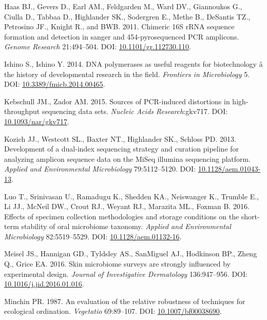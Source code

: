 \documentclass[12pt,]{article}
\begin{document}
\hypertarget{ref-Haas2011}{}
Haas BJ., Gevers D., Earl AM., Feldgarden M., Ward DV., Giannoukos G.,
Ciulla D., Tabbaa D., Highlander SK., Sodergren E., Methe B., DeSantis
TZ., Petrosino JF., Knight R., and BWB. 2011. Chimeric 16S rRNA sequence
formation and detection in sanger and 454-pyrosequenced PCR amplicons.
\emph{Genome Research} 21:494--504. DOI:
\href{https://doi.org/10.1101/gr.112730.110}{10.1101/gr.112730.110}.

\hypertarget{ref-polymerase_Ishino_2014}{}
Ishino S., Ishino Y. 2014. DNA polymerases as useful reagents for
biotechnology â the history of developmental research in the field.
\emph{Frontiers in Microbiology} 5. DOI:
\href{https://doi.org/10.3389/fmicb.2014.00465}{10.3389/fmicb.2014.00465}.

\hypertarget{ref-Kebschull2015}{}
Kebschull JM., Zador AM. 2015. Sources of PCR-induced distortions in
high-throughput sequencing data sets. \emph{Nucleic Acids
Research}:gkv717. DOI:
\href{https://doi.org/10.1093/nar/gkv717}{10.1093/nar/gkv717}.

\hypertarget{ref-protocol_Kozich_2013}{}
Kozich JJ., Westcott SL., Baxter NT., Highlander SK., Schloss PD. 2013.
Development of a dual-index sequencing strategy and curation pipeline
for analyzing amplicon sequence data on the MiSeq illumina sequencing
platform. \emph{Applied and Environmental Microbiology} 79:5112--5120.
DOI: \href{https://doi.org/10.1128/aem.01043-13}{10.1128/aem.01043-13}.

\hypertarget{ref-preservation_Luo_2016}{}
Luo T., Srinivasan U., Ramadugu K., Shedden KA., Neiswanger K., Trumble
E., Li JJ., McNeil DW., Crout RJ., Weyant RJ., Marazita ML., Foxman B.
2016. Effects of specimen collection methodologies and storage
conditions on the short-term stability of oral microbiome taxonomy.
\emph{Applied and Environmental Microbiology} 82:5519--5529. DOI:
\href{https://doi.org/10.1128/aem.01132-16}{10.1128/aem.01132-16}.

\hypertarget{ref-Meisel2016}{}
Meisel JS., Hannigan GD., Tyldsley AS., SanMiguel AJ., Hodkinson BP.,
Zheng Q., Grice EA. 2016. Skin microbiome surveys are strongly
influenced by experimental design. \emph{Journal of Investigative
Dermatology} 136:947--956. DOI:
\href{https://doi.org/10.1016/j.jid.2016.01.016}{10.1016/j.jid.2016.01.016}.

\hypertarget{ref-bc_index_Minchin1987}{}
Minchin PR. 1987. An evaluation of the relative robustness of techniques
for ecological ordination. \emph{Vegetatio} 69:89--107. DOI:
\href{https://doi.org/10.1007/bf00038690}{10.1007/bf00038690}.
\end{document}
